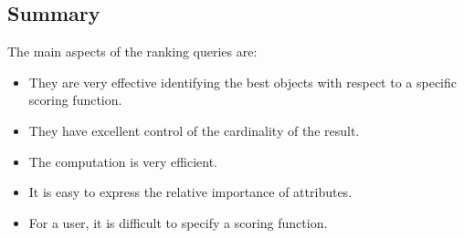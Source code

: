 \documentclass[12pt, a4paper]{report}
\newtheorem[style=M,bodystyle=\normalfont]{theorem}{Theorem}
\newtheorem[style=M,bodystyle=\normalfont]{corollary}{Corollary}
\newtheorem[style=M,bodystyle=\normalfont]{lemma}{Lemma}
\newtheorem[style=M,bodystyle=\normalfont]{definition}{Definition}
\begin{document}
    \subsection{Summary}
    \begin{table}[H]
        \centering
    \end{table}

    The main aspects of the ranking queries are: 
    \begin{itemize}
        \item They are very effective identifying the best objects with respect to a specific scoring function. 
        \item They have excellent control of the cardinality of the result. 
        \item The computation is very efficient. 
        \item It is easy to express the relative importance of attributes. 
        \item For a user, it is difficult to specify a scoring function. 
    \end{itemize}
\end{document}
